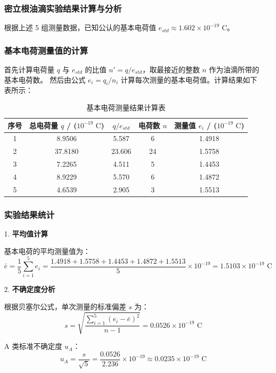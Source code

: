 \documentclass[11pt]{article}
\begin{document}
\subsubsection{密立根油滴实验结果计算与分析}

根据上述 5 组测量数据，已知公认的基本电荷值 $e_{std} \approx 1.602 \times 10^{-19} \text{ C}$。

\subsubsection{基本电荷测量值的计算}
首先计算电荷量 $q$ 与 $e_{std}$ 的比值 $n' = q / e_{std}$，取最接近的整数 $n$ 作为油滴所带的基本电荷数。
然后由公式 $e_i = q_i / n_i$ 计算每次测量的基本电荷值。计算结果如下表所示：

\begin{table}[htbp]
    \centering
    \caption{基本电荷测量结果计算表}
    \begin{tabular}{ccccc}
        \toprule
        序号 & 总电荷量 $q$ / ($10^{-19} \text{ C}$) & $q/e_{std}$ & 电荷数 $n$ & 测量值 $e_i$ / ($10^{-19} \text{ C}$) \\
        \midrule
        1 & 8.9506 & 5.587 & 6 & 1.4918 \\
        2 & 37.8180 & 23.606 & 24 & 1.5758 \\
        3 & 7.2265 & 4.511 & 5 & 1.4453 \\
        4 & 8.9229 & 5.570 & 6 & 1.4872 \\
        5 & 4.6539 & 2.905 & 3 & 1.5513 \\
        \bottomrule
    \end{tabular}
\end{table}

\subsubsection{实验结果统计}
1. \textbf{平均值计算}

基本电荷的平均测量值为：
\[ \bar{e} = \frac{1}{5} \sum_{i=1}^{5} e_i = \frac{1.4918 + 1.5758 + 1.4453 + 1.4872 + 1.5513}{5} \times 10^{-19} = 1.5103 \times 10^{-19} \text{ C} \]

2. \textbf{不确定度分析}

根据贝塞尔公式，单次测量的标准偏差 $s$ 为：
\[ s = \sqrt{\frac{\sum_{i=1}^{5} (e_i - \bar{e})^2}{n-1}} = 0.0526 \times 10^{-19} \text{ C} \]

A 类标准不确定度 $u_A$：
\[ u_A = \frac{s}{\sqrt{5}} = \frac{0.0526}{2.236} \times 10^{-19} \approx 0.0235 \times 10^{-19} \text{ C} \]
\end{document}
